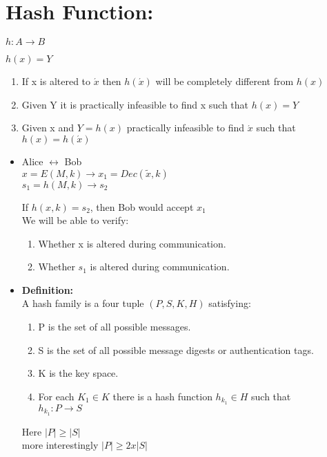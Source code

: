\documentclass[11pt]{article}
\begin{document}
\section*{Hash Function:}
\begin{center}
    $h: A \to B$
\end{center}
$h(x) = Y$ 
\begin{enumerate}
    \item If x is altered to $\acute{x}$ then $h(\acute{x})$ will be completely different from $h(x)$
    \item Given Y it is practically infeasible to find x such that $h(x) = Y$
    \item Given x and $Y = h(x)$ practically infeasible to find $\acute{x}$ such that $h(x) = h(\acute{x})$
\end{enumerate}
\begin{itemize} 
\item 
\begin{center}
    Alice $\longleftrightarrow$ Bob \\
    $x = E(M,k) \longrightarrow x_1 = Dec(\tilde{x}, k)$ \\
    $s_1 = h(M,k) \longrightarrow s_2$
\end{center}
If $h(x,k) = s_2$, then Bob would accept $x_1$ \\
We will be able to verify:
\begin{enumerate}
    \item Whether x is altered during communication.
    \item Whether $s_1$ is altered during communication.
\end{enumerate}
\item \textbf{Definition:}\\
A hash family is a four tuple $(P, S, K, H)$ satisfying:
\begin{enumerate}
    \item P is the set of all possible messages.
    \item S is the set of all possible message digests or authentication tags.
    \item K is the key space.
    \item For each $K_1 \in K$ there is a hash function $h_{k_1} \in H$ such that \\
    $h_{k_1}: P \to S$
\end{enumerate}
Here $|P| \ge |S|$\\
more interestingly $|P| \ge 2x|S|$ \\\\


\end{itemize}
\end{document}
